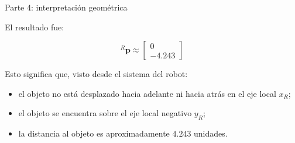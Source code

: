 \documentclass[aspectratio=169]{beamer}
\begin{document}
\begin{frame}{Parte 4: interpretación geométrica}

    El resultado fue:

    \[
    {}^{R}\mathbf{p}
    \approx
    \begin{bmatrix}
        0\\
        -4.243
    \end{bmatrix}
    \]

    Esto significa que, visto desde el sistema del robot:

    \begin{itemize}
        \item el objeto no está desplazado hacia adelante ni hacia atrás en el eje local $x_R$;
        \item el objeto se encuentra sobre el eje local negativo $y_R$;
        \item la distancia al objeto es aproximadamente $4.243$ unidades.
    \end{itemize}


\end{frame}
\end{document}
